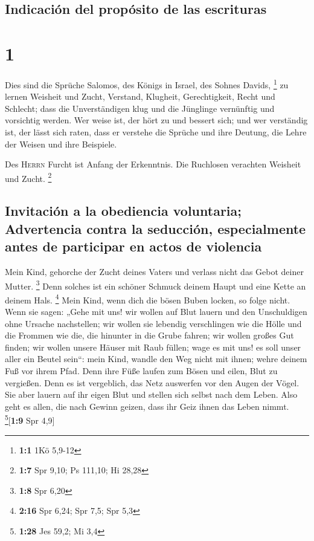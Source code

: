 \hypertarget{indicaciuxf3n-del-propuxf3sito-de-las-escrituras}{%
\subsection{Indicación del propósito de las
escrituras}\label{indicaciuxf3n-del-propuxf3sito-de-las-escrituras}}

\hypertarget{section}{%
\section{1}\label{section}}

 Dies sind die Sprüche Salomos, des Königs in Israel, des
Sohnes Davids, \footnote{\textbf{1:1} 1Kö 5,9-12}  zu
lernen Weisheit und Zucht, Verstand,  Klugheit,
Gerechtigkeit, Recht und Schlecht;  dass die
Unverständigen klug und die Jünglinge vernünftig und vorsichtig werden.
 Wer weise ist, der hört zu und bessert sich; und wer
verständig ist, der lässt sich raten,  dass er verstehe
die Sprüche und ihre Deutung, die Lehre der Weisen und ihre Beispiele.

 Des \textsc{Herrn} Furcht ist Anfang der Erkenntnis. Die
Ruchlosen verachten Weisheit und Zucht. \footnote{\textbf{1:7} Spr 9,10;
  Ps 111,10; Hi 28,28}

\hypertarget{invitaciuxf3n-a-la-obediencia-voluntaria-advertencia-contra-la-seducciuxf3n-especialmente-antes-de-participar-en-actos-de-violencia}{%
\subsection{Invitación a la obediencia voluntaria; Advertencia contra la
seducción, especialmente antes de participar en actos de
violencia}\label{invitaciuxf3n-a-la-obediencia-voluntaria-advertencia-contra-la-seducciuxf3n-especialmente-antes-de-participar-en-actos-de-violencia}}

 Mein Kind, gehorche der Zucht deines Vaters und verlass
nicht das Gebot deiner Mutter. \footnote{\textbf{1:8} Spr 6,20}
 Denn solches ist ein schöner Schmuck deinem Haupt und
eine Kette an deinem Hals. \footnote{\textbf{2:16} Spr 6,24; Spr 7,5;
  Spr 5,3}  Mein Kind, wenn dich die bösen Buben locken,
so folge nicht.  Wenn sie sagen: „Gehe mit uns! wir
wollen auf Blut lauern und den Unschuldigen ohne Ursache nachstellen;
 wir wollen sie lebendig verschlingen wie die Hölle und
die Frommen wie die, die hinunter in die Grube fahren; 
wir wollen großes Gut finden; wir wollen unsere Häuser mit Raub füllen;
 wage es mit uns! es soll unser aller ein Beutel sein``:
 mein Kind, wandle den Weg nicht mit ihnen; wehre deinem
Fuß vor ihrem Pfad.  Denn ihre Füße laufen zum Bösen und
eilen, Blut zu vergießen.  Denn es ist vergeblich, das
Netz auswerfen vor den Augen der Vögel.  Sie aber lauern
auf ihr eigen Blut und stellen sich selbst nach dem Leben.
 Also geht es allen, die nach Gewinn geizen, dass ihr
Geiz ihnen das Leben nimmt. \footnote{\textbf{1:28} Jes 59,2; Mi 3,4}{[}\textbf{1:9}
Spr 4,9{]}


